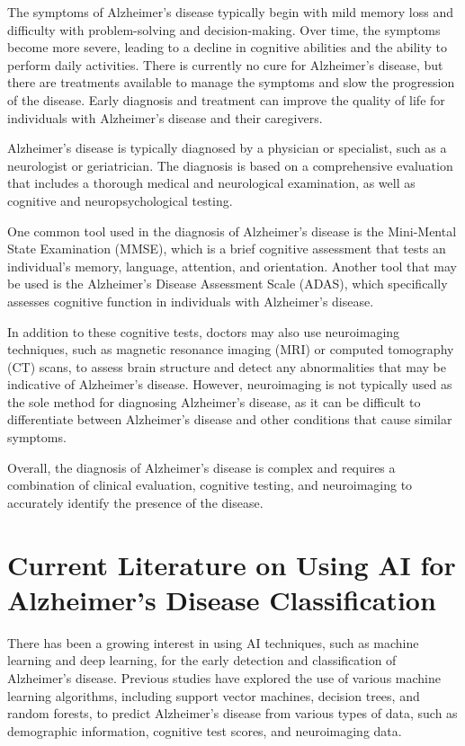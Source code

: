 \documentclass[10pt]{article}
\begin{document}
	The symptoms of Alzheimer's disease typically begin with mild memory loss and difficulty with problem-solving and decision-making. Over time, the symptoms become more severe, leading to a decline in cognitive abilities and the ability to perform daily activities. There is currently no cure for Alzheimer's disease, but there are treatments available to manage the symptoms and slow the progression of the disease. Early diagnosis and treatment can improve the quality of life for individuals with Alzheimer's disease and their caregivers.

	Alzheimer's disease is typically diagnosed by a physician or specialist, such as a neurologist or geriatrician. The diagnosis is based on a comprehensive evaluation that includes a thorough medical and neurological examination, as well as cognitive and neuropsychological testing.

	One common tool used in the diagnosis of Alzheimer's disease is the Mini-Mental State Examination (MMSE), which is a brief cognitive assessment that tests an individual's memory, language, attention, and orientation. Another tool that may be used is the Alzheimer's Disease Assessment Scale (ADAS), which specifically assesses cognitive function in individuals with Alzheimer's disease.

	In addition to these cognitive tests, doctors may also use neuroimaging techniques, such as magnetic resonance imaging (MRI) or computed tomography (CT) scans, to assess brain structure and detect any abnormalities that may be indicative of Alzheimer's disease. However, neuroimaging is not typically used as the sole method for diagnosing Alzheimer's disease, as it can be difficult to differentiate between Alzheimer's disease and other conditions that cause similar symptoms.

	Overall, the diagnosis of Alzheimer's disease is complex and requires a combination of clinical evaluation, cognitive testing, and neuroimaging to accurately identify the presence of the disease.

	\section{Current Literature on Using AI for Alzheimer's Disease Classification}

	There has been a growing interest in using AI techniques, such as machine learning and deep learning, for the early detection and classification of Alzheimer's disease. Previous studies have explored the use of various machine learning algorithms, including support vector machines, decision trees, and random forests, to predict Alzheimer's disease from various types of data, such as demographic information, cognitive test scores, and neuroimaging data.
\end{document}
